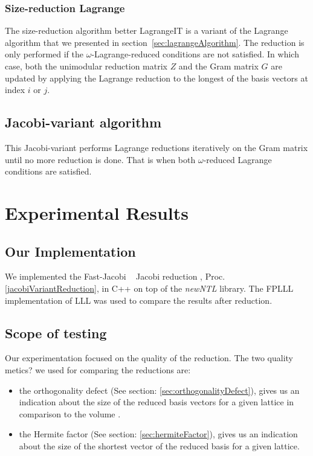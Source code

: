 \documentclass[10pt, a4paper]{article}
\newcommand{\my}[1]{{\color{blue} #1 }}
\begin{document}
\subsubsection{Size-reduction Lagrange}
The size-reduction algorithm \my{better LagrangeIT} is a variant of the Lagrange algorithm that we presented in section~\ref{sec:lagrangeAlgorithm}. The reduction is only performed if the $\omega$-Lagrange-reduced conditions are not satisfied. In which case, both the unimodular reduction matrix $Z$ and the Gram matrix $G$ are updated by applying the Lagrange reduction to the longest of the basis vectors at index $i$ or $j$.



\subsection{Jacobi-variant algorithm}
This Jacobi-variant performs Lagrange reductions iteratively on the Gram matrix until no more reduction is done. That is when both $\omega$-reduced Lagrange conditions are satisfied. 



\section{Experimental Results}

\subsection{Our Implementation}

We implemented the Fast-Jacobi\my{~\cite{}} Jacobi reduction\my{, Proc.\ref{jacobiVariantReduction},} in C++ on top of the \emph{newNTL} library. The FPLLL implementation of LLL was used to compare the results after reduction.

\subsection{Scope of testing}

Our experimentation focused on the quality of the reduction. The two quality \my{metics?} we used for comparing the reductions are:

\begin{itemize}
\item the orthogonality defect (See section: \ref{sec:orthogonalityDefect}), gives us an indication about the size of the reduced basis vectors for a given lattice \my{in comparison to the volume}.
\item the Hermite factor (See section: \ref{sec:hermiteFactor}), gives us an indication about the size of the shortest vector of the reduced basis for a given lattice.
\end{itemize}
\end{document}
